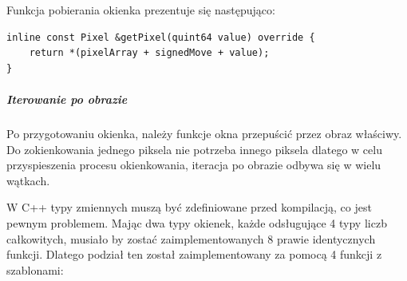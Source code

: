 \par
Funkcja pobierania okienka prezentuje się następująco:
\begin{lstlisting}
inline const Pixel &getPixel(quint64 value) override {
    return *(pixelArray + signedMove + value);
}
\end{lstlisting}

\subparagraph{Iterowanie po obrazie}
\par
Po przygotowaniu okienka, należy funkcje okna przepuścić przez obraz właściwy.
Do zokienkowania jednego piksela nie potrzeba innego piksela dlatego w celu przyspieszenia procesu okienkowania, iteracja po obrazie odbywa się w wielu wątkach.
\par
W C++ typy zmiennych muszą być zdefiniowane przed kompilacją, co jest pewnym problemem.
Mając dwa typy okienek, każde odsługujące 4 typy liczb całkowitych, musiało by zostać zaimplementowanych 8 prawie identycznych funkcji.
Dlatego podział ten został zaimplementowany za pomocą 4 funkcji z szablonami:
